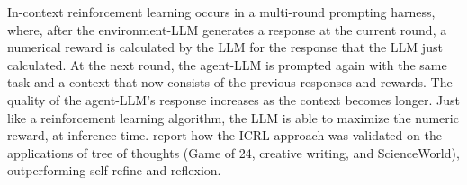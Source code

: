 In-context reinforcement learning
occurs in a multi-round prompting harness, %
where, after the environment-LLM generates a response at the current round, a numerical reward is calculated by the LLM for the response that the LLM just calculated. %
At the next round, the agent-LLM is prompted again with the same task and a context that now consists of the previous responses and rewards. The %
quality of the agent-LLM's response increases as the context becomes longer. 
Just like a reinforcement learning algorithm, the LLM is able to maximize the numeric reward, at inference time. \citet{song2025reward} report how the ICRL approach was validated on the applications of tree of thoughts %
(Game of 24, creative writing, and ScienceWorld), outperforming %
self refine and reflexion. %
%


